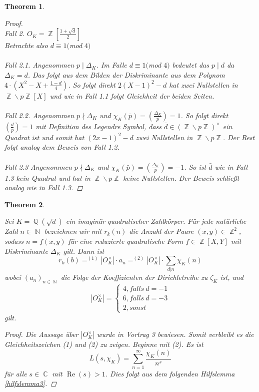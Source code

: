 \documentclass[10pt,a4paper]{article}
\theoremstyle{plain}
\newtheorem{thm}{Theorem}[section]
\theoremstyle{definition}
\theoremstyle{remark}
\DeclareMathOperator{\C}{\mathbb{C}}
\DeclareMathOperator{\Q}{\mathbb{Q}}
\DeclareMathOperator{\Z}{\mathbb{Z}}
\DeclareMathOperator{\N}{\mathbb{N}}
\DeclareMathOperator{\re}{Re}
\begin{document}
\begin{thm}
\begin{proof}
\\
\textit{Fall 2.}
$O_K= \Z[\frac{1+\sqrt{d}}{2}]$ \\
Betrachte also $d\equiv 1 ($mod $ 4)$ 
\\
\\
\textit{Fall 2.1.}
Angenommen $p \mid \Delta_K$. Im Falle $d\equiv 1 ($mod $ 4)$ bedeutet das $p\mid d$ da  $\Delta_K=d$. Das folgt aus dem Bilden der Diskriminante aus dem Polynom $4\cdot(X^2-X+\frac{1-d}{4})$. So folgt direkt $2(X-1)^{2}-d$ hat zwei Nullstellen in $\Z\backslash p\Z[X]$ und wie in Fall 1.1 folgt Gleichheit der beiden Seiten.
\\
\\
\textit{Fall 2.2.}
Angenommen $p\nmid \Delta_K$ und $\chi_K(\bar{p})=(\frac{\Delta_K}{p})=1$. So folgt direkt $(\frac{d}{p})=1$ mit Definition des Legendre Symbol, dass $\bar{d} \in (\Z\backslash p\Z)^\times$ ein Quadrat ist und somit hat $(2x-1)^2-d$ zwei Nullstellen in $\Z\backslash p\Z$. Der Rest folgt analog dem Beweis von Fall 1.2.
\\
\\
\textit{Fall 2.3}
Angenommen $p\nmid \Delta_K$ und $\chi_K(\bar{p})=(\frac{\Delta_K}{p})=-1$. So ist $\bar{d}$ wie in Fall 1.3 kein Quadrat und hat in $\Z\backslash p\Z$ keine Nullstellen. Der Beweis schließt analog wie in Fall 1.3.


\end{proof}
\end{thm}

\begin{thm}\label{theo16}

Sei $K=\Q(\sqrt{d})$ ein imaginär quadratischer Zahlkörper. Für jede natürliche Zahl $n \in \N$ bezeichnen wir mit $r_k(n)$ die Anzahl der Paare $(x,y) \in \Z^2$, sodass $n = f(x,y)$ für eine reduzierte quadratische Form $f \in \Z[X,Y]$ mit Diskriminante $\Delta_K$ gilt. Dann ist $$r_k(b) =^{(1)} |O_K^\times|\cdot a_n =^{(2)} |O_K^\times|\cdot \sum_{d|n}\chi_K(n)$$wobei $(a_n)_{n \in \N}$ die Folge der Koeffizienten der Dirichletreihe zu $\zeta_K$ ist, und $$|O_K^\times|=\begin{cases}4, falls \ d = -1\\6, falls \ d = -3\\2, sonst\end{cases}$$ gilt.
\\
\begin{proof}\renewcommand{\qedsymbol}{}
Die Aussage über $|O_K^\times|$ wurde in Vortrag 3 bewiesen. Somit verbleibt es die Gleichheitszeichen (1) und (2) zu zeigen. Beginne mit (2). Es ist $$L(s,\chi_K)=\sum_{n=1}^{\infty}\frac{\chi_K(n)}{n^s}$$ für alle $s \in \C $ mit $ \re(s) > 1$. Dies folgt aus dem folgenden Hilfslemma \ref{hilfslemma3}.
 
 \end{proof}
 \end{thm}
 
\end{document}
